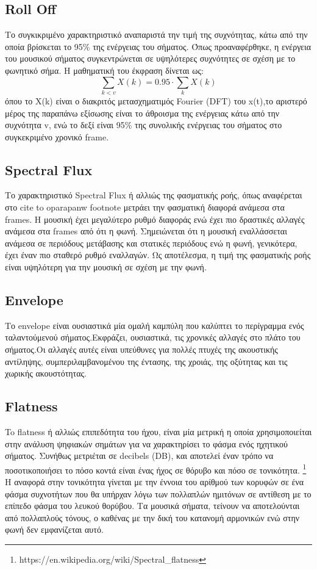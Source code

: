 \subsection{Roll Off}
 
 Το συγκικριμένο χαρακτηριστικό αναπαριστά την τιμή της συχνότητας, κάτω από την οποία βρίσκεται το 95\% της ενέργειας του σήματος. Όπως προαναφέρθηκε, η ενέργεια του μουσικού σήματος συγκεντρώνεται σε υψηλότερες συχνότητες σε σχέση με το φωνητικό σήμα. Η μαθηματική του έκφραση δίνεται ως:
 \begin{equation}
 \sum_{k<v} X(k) = 0.95 \cdot \sum_{k}X(k)
 \end{equation}
 όπου το X(k) είναι ο διακριτός μετασχηματιμός Fourier (DFT) του x(t),το αριστερό μέρος της παραπάνω εξίσωσης είναι το άθροισμα της ενέργειας κάτω από την συχνότητα v, ενώ το δεξί είναι 95\% της συνολικής ενέργειας του σήματος στο συγκεκριμένο χρονικό frame.

 \subsection{Spectral Flux}

 Το χαρακτηριστικό Spectral Flux ή αλλιώς της φασματικής ροής, όπως αναφέρεται στο 
 cite to oparapanw footnote
 μετράει την φασματική διαφορά ανάμεσα στα frames. Η μουσική έχει μεγαλύτερο ρυθμό διαφοράς ενώ έχει πιο δραστικές αλλαγές ανάμεσα στα frames από ότι η φωνή. Σημειώνεται ότι η μουσική εναλλάσσεται ανάμεσα σε περιόδους μετάβασης και στατικές περιόδους ενώ η φωνή, γενικότερα, έχει έναν πιο σταθερό ρυθμό εναλλαγών. Ως αποτέλεσμα, η τιμή της φασματικής ροής είναι υψηλότερη για την μουσική σε σχέση με την φωνή.

  \subsection{Envelope}

Το envelope είναι ουσιαστικά μία ομαλή καμπύλη που καλύπτει το περίγραμμα ενός ταλαντούμενού σήματος.Εκφράζει, ουσιαστικά, τις χρονικές αλλαγές στο πλάτο του σήματος.Οι αλλαγές αυτές είναι υπεύθυνες για πολλές πτυχές της ακουστικής αντίληψης, συμπεριλαμβανομένου της έντασης, της χροιάς, της οξύτητας και τις χωρικής ακουστότητας.


\subsection{Flatness}

To flatness ή αλλιώς επιπεδότητα του ήχου, είναι μία μετρική η οποία χρησιμοποιείται στην ανάλυση ψηφιακών σημάτων για να χαρακτηρίσει το φάσμα ενός ηχητικού σήματος. Συνήθως μετριέται σε decibels (DB), και αποτελεί έναν τρόπο να ποσοτικοποιήσει το πόσο κοντά είναι ένας ήχος σε θόρυβο και πόσο σε τονικότητα.  \footnote{https://en.wikipedia.org/wiki/Spectral\_flatness} Η αναφορά στην τονικότητα γίνεται με την έννοια του αρίθμού των κορυφών σε ένα φάσμα συχνοτήτων που θα υπήρχαν λόγω των πολλαπλών ημιτόνων σε αντίθεση με το επίπεδο φάσμα του λευκού θορύβου. Τα μουσικά σήματα, τείνουν να αποτελούνται από πολλαπλούς τόνους, ο καθένας με την δική του κατανομή αρμονικών ενώ στην φωνή δεν εμφανίζεται αυτό.


